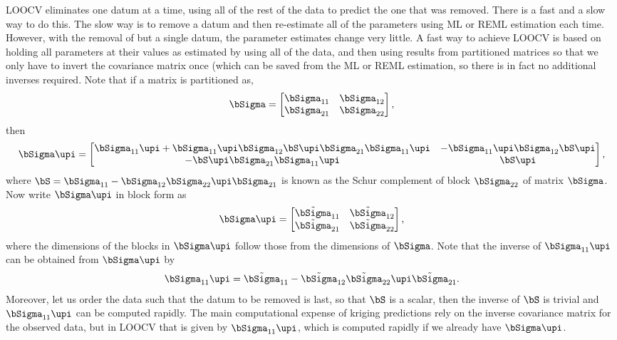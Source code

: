 \documentclass[12pt, titlepage]{article}
\begin{document}
LOOCV eliminates one datum at a time, using all of the rest of the data to predict the one that was removed.  There is a fast and a slow way to do this.  The slow way is to remove a datum and then re-estimate all of the parameters using ML or REML estimation each time.  However, with the removal of but a single datum, the parameter estimates change very little.  A fast way to achieve LOOCV is based on holding all parameters at their values as estimated by using all of the data, and then using results from partitioned matrices so that we only have to invert the covariance matrix once (which can be saved from the ML or REML estimation, so there is in fact no additional inverses required.  Note that if a matrix is partitioned as,
$$
    \bSigma = 
    \begin{bmatrix}
       {\bSigma}_{11} & {\bSigma}_{12} \\
       {\bSigma}_{21} & {\bSigma}_{22}
    \end{bmatrix},
$$
then 
$$
    \bSigma\upi = 
    \begin{bmatrix}
       \bSigma_{11}\upi + \bSigma_{11}\upi\bSigma_{12}\bS\upi\bSigma_{21}\bSigma_{11}\upi & -\bSigma_{11}\upi\bSigma_{12}\bS\upi \\
       -\bS\upi\bSigma_{21}\bSigma_{11}\upi & \bS\upi
    \end{bmatrix},
$$
where $\bS= \bSigma_{11} - \bSigma_{12}\bSigma_{22}\upi\bSigma_{21}$ is known as the Schur complement of block $\bSigma_{22}$ of matrix $\bSigma$.  Now write $\bSigma \upi$ in block form as
$$
    \bSigma \upi = 
    \begin{bmatrix}
        \tilde{\bSigma}_{11} & \tilde{\bSigma}_{12} \\
        \tilde{\bSigma}_{21} & \tilde{\bSigma}_{22}
    \end{bmatrix},
$$
where the dimensions of the blocks in $\bSigma \upi$ follow those from the dimensions of $\bSigma$. Note that the inverse of $\bSigma_{11}\upi$ can be obtained from $\bSigma \upi$ by
$$
    \bSigma_{11} \upi = \tilde{\bSigma}_{11} - \tilde{\bSigma}_{12} \tilde{\bSigma}_{22} \upi \tilde{\bSigma}_{21}.
$$
Moreover, let us order the data such that the datum to be removed is last, so that $\bS$ is a scalar, then the inverse of $\bS$ is trivial and $\bSigma_{11} \upi$ can be computed rapidly. The main computational expense of kriging predictions rely on the inverse covariance matrix for the observed data, but in LOOCV that is given by $\bSigma_{11} \upi$, which is computed rapidly if we already have $\bSigma \upi$. 
\end{document}
